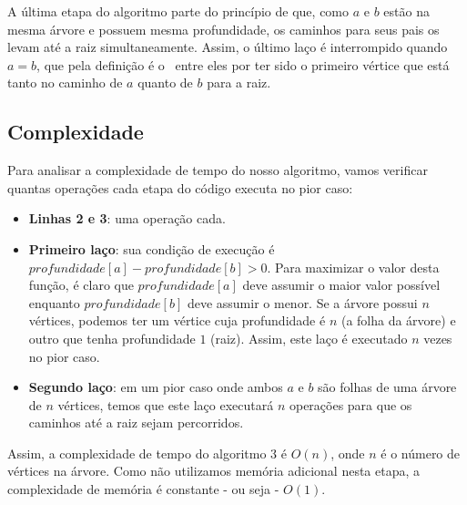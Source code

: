 A última etapa do algoritmo parte do princípio de que, como $a$ e $b$ estão na mesma árvore e possuem mesma profundidade, os caminhos para seus pais os levam até a raiz simultaneamente. Assim, o último laço é interrompido quando $a = b$, que pela definição é o \LCA\ entre eles por ter sido o primeiro vértice que está tanto no caminho de $a$ quanto de $b$ para a raiz.


\subsection{Complexidade}

Para analisar a complexidade de tempo do nosso algoritmo, vamos verificar quantas operações cada etapa do código executa no pior caso:

\begin{itemize}
    \item \textbf{Linhas 2 e 3}: uma operação cada.
    \item \textbf{Primeiro laço}: sua condição de execução é $profundidade[a] - profundidade[b] > 0$. Para maximizar o valor desta função, é claro que $profundidade[a]$ deve assumir o maior valor possível enquanto $profundidade[b]$ deve assumir o menor. Se a árvore possui $n$ vértices, podemos ter um vértice cuja profundidade é $n$ (a folha da árvore) e outro que tenha profundidade $1$ (raiz). Assim, este laço é executado $n$ vezes no pior caso.
    \item \textbf{Segundo laço}: em um pior caso onde ambos $a$ e $b$ são folhas de uma árvore de $n$ vértices, temos que este laço executará $n$ operações para que os caminhos até a raiz sejam percorridos.
\end{itemize}

Assim, a complexidade de tempo do algoritmo 3 é $O(n)$, onde $n$ é o número de vértices na árvore. Como não utilizamos memória adicional nesta etapa, a complexidade de memória é constante - ou seja - $O(1)$.